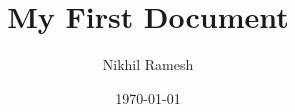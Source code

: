 \documentclass[a4paper,12pt]{article}
\begin{document}
\title{My First Document}
\author{Nikhil Ramesh}
\date{\today}
\maketitle
\end{document}
